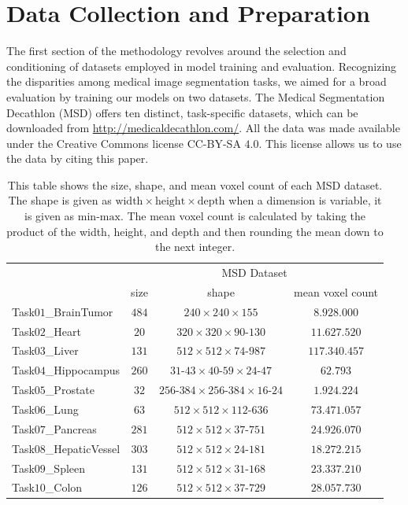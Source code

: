 \section{Data Collection and Preparation}
The first section of the methodology revolves around the selection and conditioning of datasets employed in model training and evaluation.
Recognizing the disparities among medical image segmentation tasks, we aimed for a broad evaluation by training our models on two datasets.
The Medical Segmentation Decathlon (MSD) offers ten distinct, task-specific datasets, which can be downloaded from \url{http://medicaldecathlon.com/}.
All the data was made available under the Creative Commons license CC-BY-SA $4.0$. This license allows us to use the data by citing this paper\cite[7]{simpson_large_2019}.

\newpage
\begin{table}[ht!]
\begin{center} {\footnotesize
\begin{tabular}{lccc}
\hline
	& \multicolumn{3}{c}{MSD Dataset}  \\
	& \multicolumn{1}{c}{size} & \multicolumn{1}{c}{shape} & \multicolumn{1}{c}{mean voxel count}\\
\hline
Task$01$\_BrainTumor & $484$ & $240\times240\times155$ & $8.928.000$ \\[1ex]
Task$02$\_Heart & $20$ & $320\times320\times90\mbox{-}130$ & $11.627.520$ \\[1ex]
Task$03$\_Liver & $131$ & $512\times512\times74\mbox{-}987$ & $117.340.457$ \\[1ex]
Task$04$\_Hippocampus & $260$ & $31\mbox{-}43\times40\mbox{-}59\times24\mbox{-}47$ & $62.793$ \\[1ex]
Task$05$\_Prostate & $32$ & $256\mbox{-}384\times256\mbox{-}384\times16\mbox{-}24$ & $1.924.224$ \\[1ex]
Task$06$\_Lung & $63$ & $512\times512\times112\mbox{-}636$ & $73.471.057$ \\[1ex]
Task$07$\_Pancreas & $281$ & $512\times512\times37\mbox{-}751$ & $24.926.070$ \\[1ex]
Task$08$\_HepaticVessel & $303$ & $512\times512\times24\mbox{-}181$ & $18.272.215$ \\[1ex]
Task$09$\_Spleen & $131$ & $512\times512\times31\mbox{-}168$ & $23.337.210$ \\[1ex]
Task$10$\_Colon & $126$ & $512\times512\times37\mbox{-}729$ & $28.057.730$ \\[1ex]
\hline
\end{tabular} }
\end{center}
\caption{\footnotesize This table shows the size, shape, and mean voxel count of each MSD dataset.
The shape is given as $\text{width}\times \text{height}\times \text{depth}$ when a dimension is variable, it is given as $\text{min}\mbox{-}\text{max}$.
The mean voxel count is calculated by taking the product of the width, height, and depth and then rounding the mean down to the next integer.}
\label{tab:msd}
\end{table}
